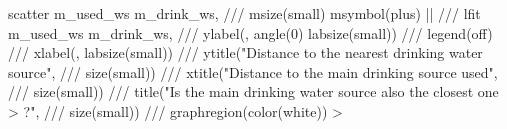 scatter m_used_ws m_drink_ws, ///
        msize(small) msymbol(plus) || ///
lfit m_used_ws m_drink_ws, ///
        ylabel(, angle(0) labsize(small)) ///
legend(off) ///
xlabel(, labsize(small)) ///
ytitle("Distance to the nearest drinking water source", ///
           size(small)) ///
xtitle("Distance to the main drinking source used", ///
           size(small)) ///
title("Is the main drinking water source also the closest one
> ?", ///
          size(small)) ///
graphregion(color(white))                                    
>                    
